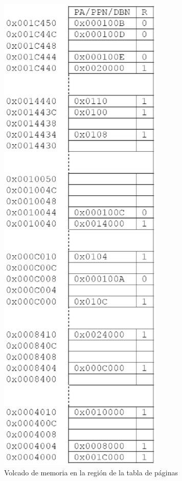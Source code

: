 \begin{enumerate}
\begin{figure}[h]
	\includegraphics[width=0.7\textwidth]{./gfx/vm_mem_dump}
	\caption{Volcado de memoria en la región de la tabla de páginas}
	\label{fig:vm_mem_dump}
	\end{figure}


\end{enumerate}
